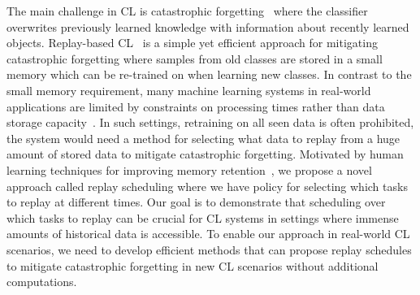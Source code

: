 The main challenge in CL is catastrophic forgetting~\cite{mccloskey1989catastrophic} where the classifier overwrites previously learned knowledge with information about recently learned objects. 
Replay-based CL~\cite{delange2021continual,parisi2019continual} is a simple yet efficient approach for mitigating catastrophic forgetting where samples from old classes are stored in a small memory which can be re-trained on when learning new classes. In contrast to the small memory requirement, many machine learning systems in real-world applications are limited by constraints on processing times rather than data storage capacity~\cite{mitchell1999machinelearning,hazelwood2018applied,bailis2017macrobase}. In such settings, retraining on all seen data is often prohibited, the system would need a method for selecting what data to replay from a huge amount of stored data to mitigate catastrophic forgetting.  
Motivated by human learning techniques for improving memory retention~\cite{dempster1989spacing, ebbinghaus2013memory, hawley2008comparison, landauer1978optimum, smolen2016right}, we propose a novel approach called replay scheduling where we have policy for selecting which tasks to replay at different times. Our goal is to demonstrate that scheduling over which tasks to replay can be crucial for CL systems in settings where immense amounts of historical data is accessible. To enable our approach in real-world CL scenarios, we need to develop efficient methods that can propose replay schedules to mitigate catastrophic forgetting in new CL scenarios without additional computations. 




